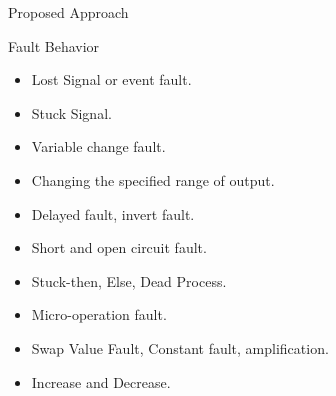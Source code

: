 \documentclass[aspectratio=1610]{beamer}
\begin{document}
\begin{frame}{Proposed Approach}


\begin{block}{Fault Behavior}
\end{block}

\begin{itemize}

\item Lost Signal or event fault.
\item Stuck Signal.
\item Variable change fault.

\item Changing the specified range of output.
\item Delayed fault, invert fault.
\item Short and open circuit fault. 
\item Stuck-then, Else, Dead Process.

\item Micro-operation fault.
\item Swap Value Fault, Constant fault, amplification.
\item Increase and Decrease.
\end{itemize}


\end{frame}
\end{document}
